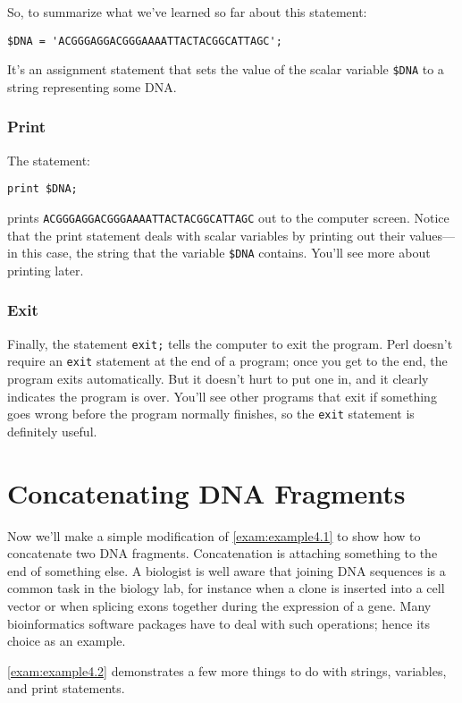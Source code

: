 So, to summarize what we've learned so far about this statement:

\begin{lstlisting}
$DNA = 'ACGGGAGGACGGGAAAATTACTACGGCATTAGC';
\end{lstlisting}

It's an assignment statement that sets the value of the scalar variable \verb|$DNA| to a string representing some DNA. 

\subsubsection{Print}
The statement:

\begin{lstlisting}
print $DNA;
\end{lstlisting}

prints \verb|ACGGGAGGACGGGAAAATTACTACGGCATTAGC| out to the computer screen.  Notice that the print statement deals with scalar variables by printing out their values—in this case, the string that the variable \verb|$DNA| contains. You'll see more about printing later. 

\subsubsection{Exit}
Finally, the statement \verb|exit;| tells the computer to exit the program.  Perl doesn't require an \verb|exit| statement at the end of a program; once you get to the end, the program exits automatically. But it doesn't hurt to put one in, and it clearly indicates the program is over. You'll see other programs that exit if something goes wrong before the program normally finishes, so the \verb|exit| statement is definitely useful. 

\section{Concatenating DNA Fragments}
  Now we'll make a simple modification of \autoref{exam:example4.1} to show how to concatenate two DNA fragments. Concatenation is attaching something to the end of something else. A biologist is well aware that joining DNA sequences is a common task in the biology lab, for instance when a clone is inserted into a cell vector or when splicing exons together during the expression of a gene. Many bioinformatics software packages have to deal with such operations; hence its choice as an example.

\autoref{exam:example4.2} demonstrates a few more things to do with strings, variables, and print statements. 


